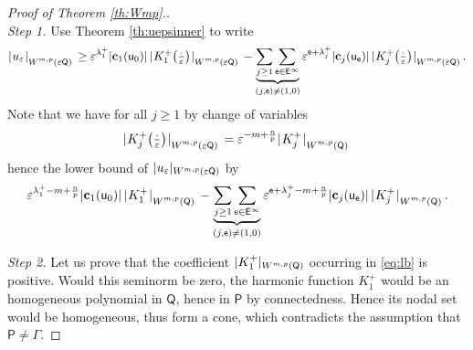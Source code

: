 \documentclass[titlepage,12pt]{amsart}
\theoremstyle{definition}
\theoremstyle{remark}
\numberwithin{equation}{section}
\newcommand{\ee}{\hskip0.15ex}
\newcommand{\dd}[1]{_{\raise-0.6ex\hbox{$\scriptstyle #1$}}}
\newcommand {\Norm}[2]{ \mathchoice
    {|\ee #1\ee|\dd{#2}\,}
    {| #1 |_{#2}}
    {| #1 |_{#2}}
    {| #1 |_{#2}} }
\newcommand{\rP}{{\mathsf{P}}}
\newcommand{\rQ}{{\mathsf{Q}}}
\newcommand{\sfe}{{\mathsf e}}
\newcommand{\sfE}{{\mathsf E}}
\newcommand{\sfu}{{\mathsf u}}
\begin{document}
\begin{proof}[Proof of Theorem \ref{th:Wmp}.]\mbox{ }\\
{\em Step 1.} Use Theorem \ref{th:uepsinner} to write
\[
   \Norm{u_\varepsilon}{W^{m,p}(\varepsilon\rQ)} \ge 
   \varepsilon^{\lambda^+_1}
   |\mathbf{c}_1(\sfu_0)|\, 
   \Norm{K^+_1\big(\tfrac{\cdot}{\varepsilon}\big)}{W^{m,p}(\varepsilon\rQ)} -
   \underbrace{\sum_{j\ge 1} \sum_{\sfe\in\sfE^\infty}}_{(j,\sfe)\neq(1,0)} 
   \varepsilon^{\sfe+\lambda^+_j} 
   |\mathbf{c}_j(\sfu_\sfe)|\, 
   \Norm{K^+_j\big(\tfrac{\cdot}{\varepsilon}\big)}{W^{m,p}(\varepsilon\rQ)}.
\]
Note that we have for all $j\ge1$ by change of variables
\begin{equation}
\label{eq:varch}
   \Norm{K^+_j\big(\tfrac{\cdot}{\varepsilon}\big)}{W^{m,p}(\varepsilon\rQ)} =
   \varepsilon^{-m+\frac{n}{p}}
   \Norm{K^+_j}{W^{m,p}(\rQ)}
\end{equation}
hence the lower bound of $\Norm{u_\varepsilon}{W^{m,p}(\varepsilon\rQ)}$ by
\begin{equation}
\label{eq:lb}
   \varepsilon^{\lambda^+_1-m+\frac{n}{p}}
   |\mathbf{c}_1(\sfu_0)|\, 
   \Norm{K^+_1}{W^{m,p}(\rQ)}  -
   \underbrace{\sum_{j\ge 1} \sum_{\sfe\in\sfE^\infty}}_{(j,\sfe)\neq(1,0)} 
   \varepsilon^{\sfe+\lambda^+_j-m+\frac{n}{p}} 
   |\mathbf{c}_j(\sfu_\sfe)|\, 
   \Norm{K^+_j}{W^{m,p}(\rQ)}.
\end{equation}

{\em Step 2.} Let us prove that the coefficient $\Norm{K^+_1}{W^{m,p}(\rQ)}$ occurring in \eqref{eq:lb} is positive. 
Would this seminorm be zero, the harmonic function $K^+_1$ would be an homogeneous polynomial in $\rQ$, hence in $\rP$ by connectedness. Hence its nodal set would be homogeneous, thus form a cone, which contradicts the assumption that $\rP\neq\Gamma$.


\end{proof}
\end{document}
